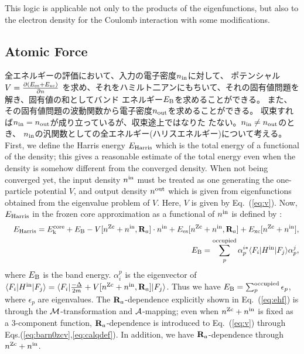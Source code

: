 \documentclass[a4paper,10pt,aip,onecolumn,amsmath,amssymb,floatfix,rmp]{revtex4-1}
\newcommand{\bfR}{{\bf R}}
\def\calR{{\cal A}}
\newcommand{\req}[1]{\mbox{Eq.~\!(\ref{#1})}}
\def\nzc{n^{\rm Zc}}
\def\MM{{\cal M}}
\def\ehf{E_{\rm Harris}}
\def\nin{n^{\rm in}}
\def\nout{n^{\rm out}}
\begin{document}
This logic is applicable not only to the products of the eigenfunctions, 
but also to the electron density for the Coulomb interaction 
with some modifications.



\begin{widetext}
\subsection{Atomic Force}
\label{sec:force}
全エネルギーの評価において、入力の電子密度$n_{\rm in}$に対して、
ポテンシャル$V=\frac{\partial (E_{\rm es} + E_{\rm xc})}{\partial n}$
を求め、それをハミルト二アンにもちいて、それの固有値問題を解き、固有値の和としてバンド
エネルギー$E_{\rm B}$を求めることができる。
また、その固有値問題の波動関数から電子密度$n_{\rm out}$を求めることができる。
収束すれば$n_{\rm in}=n_{\rm out}$が成り立っているが、収束途上ではなりた
たない。$n_{\rm in}\ne n_{\rm out}$のとき、
$n_{\rm in}$の汎関数としての全エネルギー(ハリスエネルギー)について考える。\\

First, we define the Harris energy $\ehf$ \cite{molforce,harris85} 
which is the total energy of a functional of the density; this gives
a reasonable estimate of the total energy even when the density is
somehow different from the converged density.
When not being converged yet, the input density $\nin$
must be treated as one generating the one-particle potential $V$,
and output density $\nout$ which is given from eigenfunctions
obtained from the eigenvalue problem of $V$. Here, $
V$ is given by \req{eq:v}. Now, $\ehf$ in the frozen core
approximation as a functional of $\nin$ is defined by \cite{molforce}:
\begin{eqnarray}
&&\ehf = E_{\rm k}^{\rm core} + E_{\rm B} - V[\nzc+\nin,\bfR_a] \cdot \nin 
+ E_{\rm es}[\nzc+\nin,\bfR_a] + E_{\rm xc}[\nzc+\nin],
\label{eq:ehf} \\
&&E_{\rm B} = \sum_p^{\rm occupied}
\alpha_{p}^{i*} 
\langle F_i|H^{\rm in}|F_j \rangle 
\alpha_p^j,
\label{eq:ebhf}
\end{eqnarray}
where $E_{\rm B}$ is the band energy.
$\alpha_i^p$ is the eigenvector of 
$\langle F_i|H^{\rm in}|F_j \rangle=
\langle F_i| \frac{-\Delta}{2m} + V[\nzc+\nin,\bfR_a] |F_j\rangle$.
Thus we have $E_{\rm B}=\sum^{\rm occupied}_p \epsilon_p$, where $\epsilon_p$ are eigenvalues.
The $\bfR_a$-dependence explicitly shown in \req{eq:ehf} is
through the $\MM$-transformation and $\calR$-mapping;
even when $\nzc+\nin$ is fixed as a 3-component function,
$\bfR_a$-dependence is introduced to \req{eq:v} through Eqs.(\ref{eq:barn0zcv},\ref{eq:calqdef}).
In addition, we have $\bfR_a$-dependence through $\nzc+\nin$.


\end{widetext}
\end{document}
